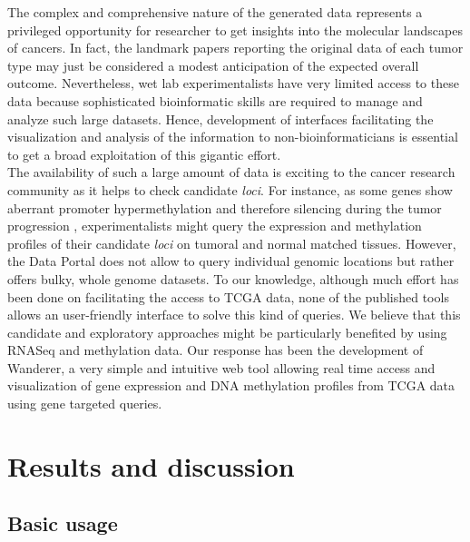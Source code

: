 \documentclass{bmcart}
\begin{document}
The complex and comprehensive  nature of the generated data represents a privileged opportunity for researcher to get insights into the molecular landscapes of cancers. In fact, the landmark papers reporting the original data of each tumor type may just be considered a modest anticipation of the expected overall outcome. Nevertheless,  wet lab experimentalists have very limited access to these data because sophisticated bioinformatic skills are required to manage and analyze such large datasets. Hence, development of interfaces facilitating the visualization and analysis of the information to non-bioinformaticians is essential to get a broad exploitation of this gigantic effort.\\

The availability of such a large amount of data is exciting to the cancer research community as it helps to check candidate \textit{loci}. For instance, as some genes show aberrant promoter hypermethylation and therefore silencing during the tumor progression \cite{jones2002fundamental}, experimentalists might query the expression and methylation profiles of their candidate \textit{loci} on tumoral and normal matched tissues. However, the Data Portal does not allow to query individual genomic locations but rather offers bulky, whole genome datasets. To our knowledge, although much effort has been done on facilitating the access to TCGA data, none of the published tools allows an user-friendly interface to solve this kind of queries. We believe that this candidate and exploratory approaches might be particularly benefited by using RNASeq and methylation data. Our response has been the development of Wanderer, a very simple and intuitive web tool allowing real time access and visualization of gene expression and DNA methylation profiles from TCGA data using gene targeted queries.\\


\section*{Results and discussion}

\subsection*{Basic usage}

\end{document}
